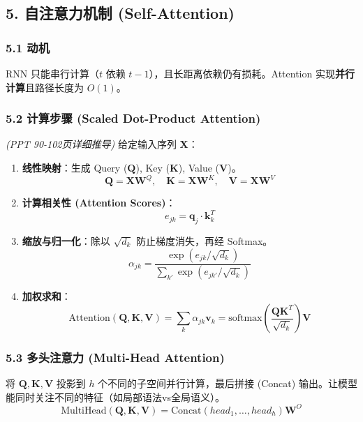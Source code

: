 \documentclass[a4paper, 11pt]{ctexart}
\begin{document}
\subsection{5. 自注意力机制 (Self-Attention)}

\subsubsection{5.1 动机}
RNN 只能串行计算（$t$ 依赖 $t-1$），且长距离依赖仍有损耗。Attention 实现\textbf{并行计算}且路径长度为 $O(1)$。

\subsubsection{5.2 计算步骤 (Scaled Dot-Product Attention)}
\textit{(PPT 90-102页详细推导)}
给定输入序列 $\mathbf{X}$：
\begin{enumerate}
    \item \textbf{线性映射}：生成 Query ($\mathbf{Q}$), Key ($\mathbf{K}$), Value ($\mathbf{V}$)。
    $$ \mathbf{Q} = \mathbf{X}\mathbf{W}^Q, \quad \mathbf{K} = \mathbf{X}\mathbf{W}^K, \quad \mathbf{V} = \mathbf{X}\mathbf{W}^V $$
    \item \textbf{计算相关性 (Attention Scores)}：
    $$ e_{jk} = \mathbf{q}_j \cdot \mathbf{k}_k^T $$
    \item \textbf{缩放与归一化}：除以 $\sqrt{d_k}$ 防止梯度消失，再经 Softmax。
    $$ \alpha_{jk} = \frac{\exp(e_{jk} / \sqrt{d_k})}{\sum_{k'} \exp(e_{jk'} / \sqrt{d_k})} $$
    \item \textbf{加权求和}：
    $$ \text{Attention}(\mathbf{Q}, \mathbf{K}, \mathbf{V}) = \sum_k \alpha_{jk} \mathbf{v}_k = \text{softmax}\left(\frac{\mathbf{Q}\mathbf{K}^T}{\sqrt{d_k}}\right)\mathbf{V} $$
\end{enumerate}

\subsubsection{5.3 多头注意力 (Multi-Head Attention)}
将 $\mathbf{Q}, \mathbf{K}, \mathbf{V}$ 投影到 $h$ 个不同的子空间并行计算，最后拼接 (Concat) 输出。让模型能同时关注不同的特征（如局部语法vs全局语义）。
$$ \text{MultiHead}(\mathbf{Q}, \mathbf{K}, \mathbf{V}) = \text{Concat}(head_1, \dots, head_h)\mathbf{W}^O $$
\end{document}
